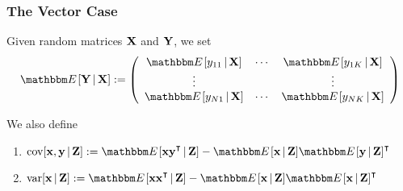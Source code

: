 \begin{frame}\frametitle{The Vector Case}

    \vspace{2em}
    Given random matrices $\mathbf X$ and $\mathbf Y$, we set
    \begin{equation*}
        \EE [\boldY \given \boldX]
        := 
        \left(
        \begin{array}{cccc}
            \EE [y_{11} \given \boldX]  & \cdots & \EE [y_{1K} \given \boldX] \\
            \vdots &  & \vdots \\
            \EE [y_{N1} \given \boldX]  & \cdots & \EE [y_{NK} \given \boldX]
        \end{array}
        \right)
    \end{equation*}
    
    \vspace{1em}
    We also define
    \begin{enumerate}
        \item $\cov [\boldx, \boldy \given \boldZ]
         := \EE[ \boldx \boldy^\T \given \boldZ ] - \EE[\boldx\given \boldZ ]
         \EE[\boldy\given \boldZ ]^\T$
        \item $\var[\boldx \given \boldZ] 
        := \EE [\boldx \boldx^\T\given \boldZ ] - 
            \EE [\boldx\given \boldZ ] \EE[\boldx\given \boldZ ]^\T$
    \end{enumerate}

\end{frame}

